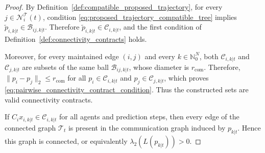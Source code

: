 \documentclass[10pt,a4paper]{amsart}
\begin{document}
\begin{proof}
	By Definition~\ref{def:compatible_proposed_trajectory}, for every
	$j\in\mathcal{N}^{\mathcal{T}}_i(t)$, condition
	\eqref{eq:proposed_trajectory_compatible_tree} implies
	$\tilde p_{i,k|t}\in\mathcal{B}_{ij,k|t}$. Therefore
	$\tilde p_{i,k|t}\in\mathcal{C}_{i,k|t}$, and the first condition of
	Definition~\ref{def:connectivity_contracts} holds.

	Moreover, for every maintained edge $(i,j)$ and every
	$k\in\mathbb{N}_0^N$, both $\mathcal{C}_{i,k|t}$ and
	$\mathcal{C}_{j,k|t}$ are subsets of the same ball
	$\mathcal{B}_{ij,k|t}$, whose diameter is $r_{\mathrm{com}}$.
	Therefore, $\|p_i-p_j\|_2\leq r_{\mathrm{com}}$ for all
	$p_i\in\mathcal{C}_{i,k|t}$ and
	$p_j\in\mathcal{C}_{j,k|t}$, which proves
	\eqref{eq:pairwise_connectivity_contract_condition}. Thus the constructed sets
	are valid connectivity contracts.

	If $C_i x_{i,k|t}\in\mathcal{C}_{i,k|t}$ for all agents and prediction steps,
	then every edge of the connected graph $\mathcal{T}_t$ is present in the
	communication graph induced by $p_{k|t}$. Hence this graph is connected, or
	equivalently $\lambda_2(L(p_{k|t}))>0$.
\end{proof}
\end{document}
